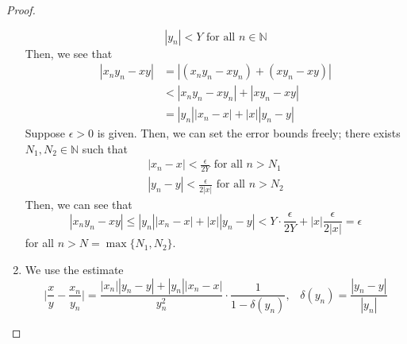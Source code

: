 \begin{proof}
\begin{enumerate}
      \begin{equation}
        |y_n| < Y \text{ for all } n \in \mathbb{N}
      \end{equation}
      Then, we see that
      \begin{align}
        |x_n y_n - xy| & = |(x_n y_n - xy_n) + (xy_n - xy)| \\
        & < |x_n y_n - x y_n| + |x y_n - xy| \\
        & = |y_n| |x_n - x| + |x| |y_n - y|
      \end{align}
      Suppose $\epsilon > 0$ is given. Then, we can set the error bounds freely; there exists $N_1, N_2 \in \mathbb{N}$ such that 
      \begin{align}
        |x_n - x| < \frac{\epsilon}{2Y} \text{ for all } n > N_1 \\
        |y_n - y| < \frac{\epsilon}{2|x|} \text{ for all } n > N_2
      \end{align}
      Then, we can see that 
      \begin{equation}
        |x_n y_n - xy| \leq |y_n||x_n -x| + |x| |y_n - y| < Y \cdot \frac{\epsilon}{2Y} + |x| \frac{\epsilon}{2|x|} = \epsilon
      \end{equation}
      for all $n> N = \max\{N_1, N_2\}$.

      \item We use the estimate
      \begin{equation}
        \bigg| \frac{x}{y} - \frac{x_n}{y_n} \bigg| = \frac{|x_n| |y_n - y| + |y_n||x_n - x|}{y_n^2} \cdot \frac{1}{1 - \delta(y_n)}, \;\;\; \delta(y_n) = \frac{|y_n - y|}{|y_n|}
      \end{equation}


\end{enumerate}
\end{proof}
